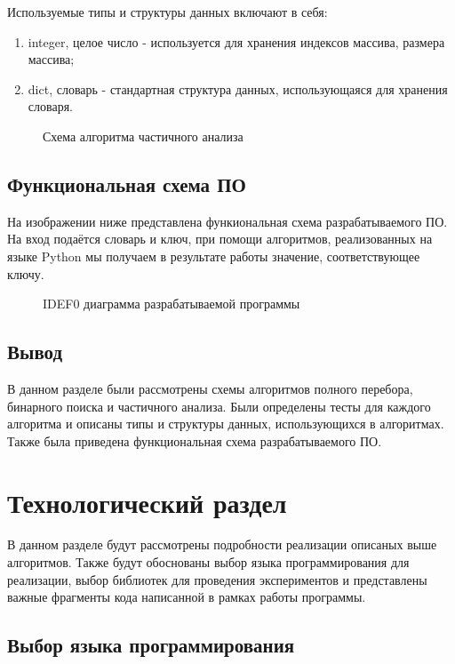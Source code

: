 Используемые типы и структуры данных включают в себя:
\begin{enumerate}
	\item integer, целое число - используется для хранения индексов массива, размера массива;
	\item dict, словарь - стандартная структура данных, использующаяся для хранения словаря.
\end{enumerate}


\begin{figure}[ph!]
	\caption{Схема алгоритма частичного анализа}
\end{figure}

\newpage

\section{Функциональная схема ПО}
На изображении ниже представлена функиональная схема разрабатываемого ПО. На вход подаётся словарь и ключ, при помощи алгоритмов, реализованных на языке Python мы получаем в результате работы значение, соответствующее ключу.

\begin{figure}[ph!]
	\caption{IDEF0 диаграмма разрабатываемой программы}
\end{figure}

\section{Вывод}
В данном разделе были рассмотрены схемы алгоритмов полного перебора, бинарного поиска и частичного анализа. Были определены тесты для каждого алгоритма и описаны типы и структуры данных, использующихся в алгоритмах. Также была приведена функциональная схема разрабатываемого ПО.

\chapter{Технологический раздел}

В данном разделе будут рассмотрены подробности реализации описаных выше алгоритмов. Также будут обоснованы выбор языка программирования для реализации, выбор библиотек для проведения экспериментов и представлены важные фрагменты кода написанной в рамках работы программы.

\section{Выбор языка программирования}

